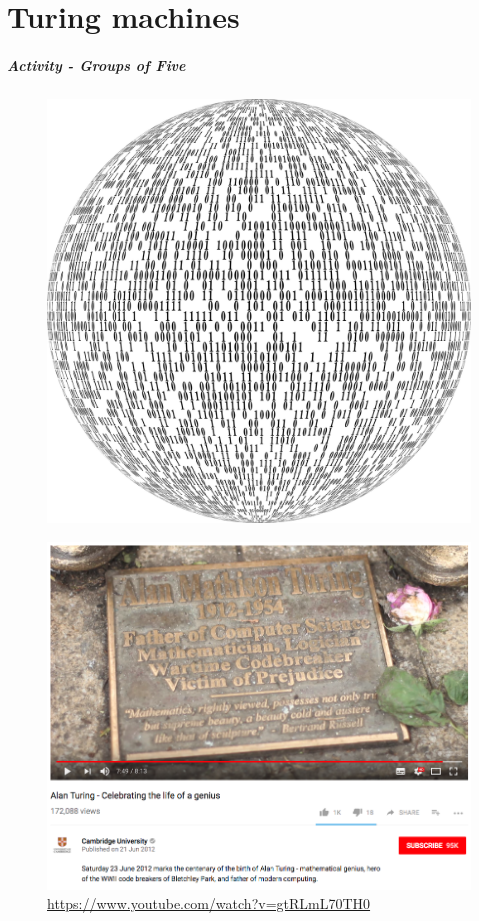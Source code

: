 \part{Turing machines}
\frame{\partpage}

\begin{frame}
	\frametitle{Activity - Groups of Five}
	\begin{figure}
		\includegraphics[scale=0.3]{assets/activity.png}
	\end{figure}
\end{frame}

\begin{frame}
	\begin{figure}
		\includegraphics[scale=0.2]{assets/turingvideo.png}
		\caption{\href{https://www.youtube.com/watch?v=gtRLmL70TH0}{https://www.youtube.com/watch?v=gtRLmL70TH0}}
	\end{figure}
\end{frame}

